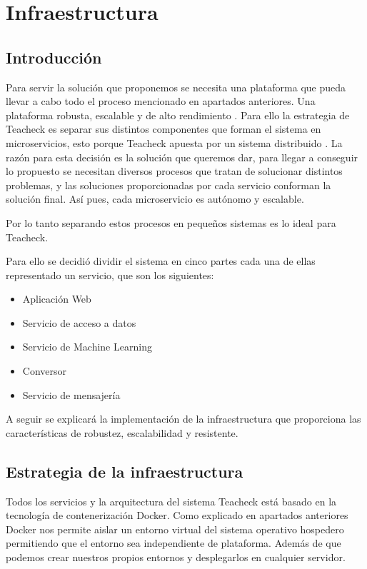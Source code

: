 \chapter{Infraestructura}

\section{Introducción}
Para servir la solución que proponemos se necesita una plataforma que
pueda llevar a cabo todo el proceso mencionado en apartados
anteriores. Una plataforma robusta, escalable y de alto
rendimiento \cite{releaseit}. Para ello la estrategia de Teacheck es separar sus
distintos componentes que forman el sistema en microservicios, esto
porque Teacheck apuesta por un sistema distribuido \cite{buildingReactiveMicroservices}. La razón para esta
decisión es la solución que queremos dar, para llegar a conseguir lo
propuesto se necesitan diversos procesos que tratan de solucionar
distintos problemas, y las soluciones proporcionadas por cada servicio
conforman la solución final. Así pues, cada microservicio es autónomo y
escalable.

Por lo tanto separando estos procesos en pequeños sistemas es lo ideal
para Teacheck.

Para ello se decidió dividir el sistema en cinco partes cada una de
ellas representado un servicio, que son los siguientes:
\begin{itemize}
\item{Aplicación Web}
\item{Servicio de acceso a datos}
\item{Servicio de Machine Learning}
\item{Conversor}
\item{Servicio de mensajería}
\end{itemize}

A seguir se explicará la implementación de la infraestructura que
proporciona las características de robustez, escalabilidad y
resistente.
\section{Estrategia de la infraestructura}

Todos los servicios y la arquitectura del sistema Teacheck está basado
en la tecnología de contenerización Docker. Como explicado en
apartados anteriores Docker nos permite aislar un entorno virtual del
sistema operativo hospedero permitiendo que el entorno sea
independiente de plataforma. Además de que podemos crear nuestros
propios entornos y desplegarlos en cualquier servidor.

